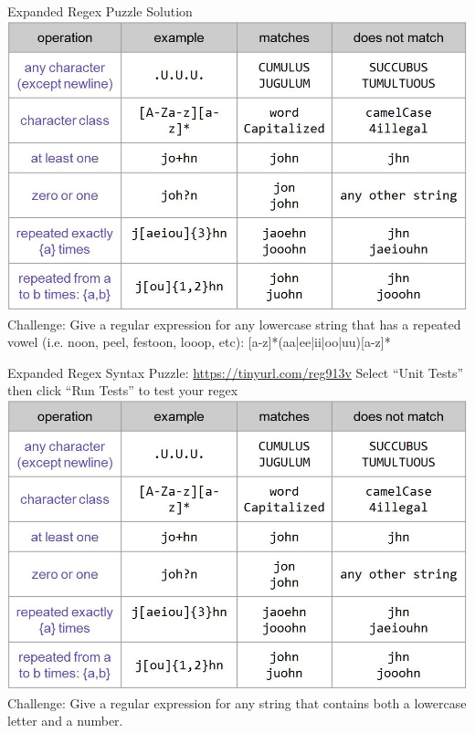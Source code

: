 \documentclass[aspectratio=169]{../latex_main/tntbeamer}  %
\begin{document}
	
	
	\begin{frame}{Expanded Regex Puzzle Solution}
	    \includegraphics[scale=.33]{Bild13}\\
	   Challenge: Give a regular expression for any lowercase string that has a repeated vowel (i.e. noon, peel, festoon, looop, etc): [a-z]*(aa|ee|ii|oo|uu)[a-z]*
	\end{frame}
	
	
	
	\begin{frame}{Expanded Regex Syntax Puzzle: \url{https://tinyurl.com/reg913v}}
	   Select “Unit Tests” then click “Run Tests” to test your regex\\ \includegraphics[scale=.3]{Bild13} \\
	   Challenge: Give a regular expression for any string that contains both a lowercase letter and a number.
	\end{frame}
	
\end{document}
